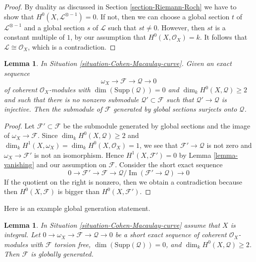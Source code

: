 \documentclass{stacks-project}
\theoremstyle{plain}
\newtheorem{lemma}[subsection]{Lemma}
\theoremstyle{definition}
\theoremstyle{remark}
\numberwithin{equation}{subsection}
\def\Im{\mathop{\mathrm{Im}}}
\begin{document}
\begin{proof}
By duality as discussed in Section \ref{section-Riemann-Roch} we have to
show that $H^0(X, \mathcal{L}^{\otimes - 1}) = 0$. If not, then we can
choose a global section $t$ of $\mathcal{L}^{\otimes - 1}$
and a global section $s$ of $\mathcal{L}$ such that $st \not = 0$.
However, then $st$ is a constant multiple of $1$, by our assumption
that $H^0(X, \mathcal{O}_X) = k$. It follows that
$\mathcal{L} \cong \mathcal{O}_X$, which is a contradiction.
\end{proof}

\begin{lemma}
\label{lemma-globally-generated}
In Situation \ref{situation-Cohen-Macaulay-curve}. Given an exact sequence
$$
\omega_X \to \mathcal{F} \to \mathcal{Q} \to 0
$$
of coherent $\mathcal{O}_X$-modules with $\dim(\text{Supp}(\mathcal{Q})) = 0$
and $\dim_k H^0(X, \mathcal{Q}) \geq 2$ and such that there is no nonzero
submodule $\mathcal{Q}' \subset \mathcal{F}$ such that
$\mathcal{Q}' \to \mathcal{Q}$ is injective.
Then the submodule of $\mathcal{F}$ generated by global
sections surjects onto $\mathcal{Q}$.
\end{lemma}

\begin{proof}
Let $\mathcal{F}' \subset \mathcal{F}$ be the submodule generated by
global sections and the image of $\omega_X \to \mathcal{F}$. Since
$\dim_k H^0(X, \mathcal{Q}) \geq 2$ and
$\dim_k H^1(X, \omega_X) = \dim_k H^0(X, \mathcal{O}_X) = 1$,
we see that $\mathcal{F}' \to \mathcal{Q}$ is not zero and
$\omega_X \to \mathcal{F}'$ is not an isomorphism.
Hence $H^1(X, \mathcal{F}') = 0$ by Lemma \ref{lemma-vanishing}
and our assumption on $\mathcal{F}$.
Consider the short exact sequence
$$
0 \to \mathcal{F}' \to \mathcal{F} \to
\mathcal{Q}/\Im(\mathcal{F}' \to \mathcal{Q}) \to 0
$$
If the quotient on the right is nonzero, then we obtain a contradiction
because then $H^0(X, \mathcal{F})$ is bigger than $H^0(X, \mathcal{F}')$.
\end{proof}

\noindent
Here is an example global generation statement.

\begin{lemma}
\label{lemma-globally-generated-curve}
In Situation \ref{situation-Cohen-Macaulay-curve} assume that
$X$ is integral. Let $0 \to \omega_X \to \mathcal{F} \to \mathcal{Q} \to 0$
be a short exact sequence of coherent $\mathcal{O}_X$-modules with
$\mathcal{F}$ torsion free, $\dim(\text{Supp}(\mathcal{Q})) = 0$,
and $\dim_k H^0(X, \mathcal{Q}) \geq 2$. Then $\mathcal{F}$
is globally generated.
\end{lemma}
\end{document}
